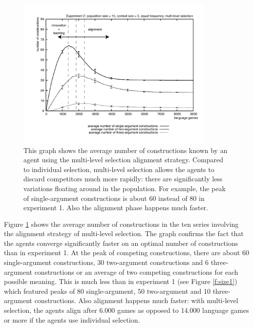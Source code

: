 \begin{figure}[t]
\centerline{\includegraphics[width=0.87\textwidth]{Chapter4/figs/size2d}}
  \caption[Experiment 2: number of constructions with multi-level selection]{This graph shows the average number of constructions known by an agent using the multi-level selection alignment strategy. Compared to individual selection, multi-level selection allows the agents to discard competitors much more rapidly: there are significantly less variations floating around in the population. For example, the peak of single-argument constructions is about 60 instead of 80 in experiment 1. Also the alignment phase happens much faster.}
   \label{f:size2d}
\end{figure}

Figure \ref{f:size2d} shows the average number of constructions in the ten series involving the alignment strategy of multi-level selection. The graph confirms the fact that the agents converge significantly faster on an optimal number of constructions than in experiment 1. At the peak of competing constructions, there are about 60 single-argument constructions, 30 two-argument constructions and 6 three-argument constructions or an average of two competing constructions for each possible meaning. This is much less than in experiment 1 (see Figure \ref{f:size1}) which featured peaks of 80 single-argument, 50 two-argument and 10 three-argument constructions. Also alignment happens much faster: with multi-level selection, the agents align after 6.000 games as opposed to 14.000 language games or more if the agents use individual selection.

